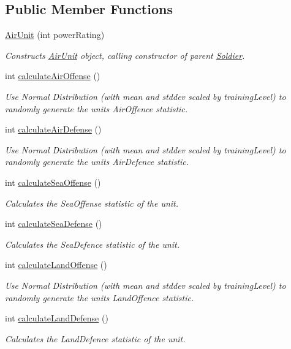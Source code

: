 \subsection*{Public Member Functions}
\begin{DoxyCompactItemize}
\item 
\mbox{\hyperlink{class_air_unit_aae4869e6b964d1ae03ab0c18cfc2631f}{Air\+Unit}} (int power\+Rating)
\begin{DoxyCompactList}\small\item\em Constructs \mbox{\hyperlink{class_air_unit}{Air\+Unit}} object, calling constructor of parent \mbox{\hyperlink{class_soldier}{Soldier}}. \end{DoxyCompactList}\item 
int \mbox{\hyperlink{class_air_unit_a522f54b197f6b2daf784f4a9eacb9edc}{calculate\+Air\+Offense}} ()
\begin{DoxyCompactList}\small\item\em Use Normal Distribution (with mean and stddev scaled by training\+Level) to randomly generate the unit\textquotesingle{}s Air\+Offence statistic. \end{DoxyCompactList}\item 
int \mbox{\hyperlink{class_air_unit_a78796cdf870a76c072e89445a4c8ba15}{calculate\+Air\+Defense}} ()
\begin{DoxyCompactList}\small\item\em Use Normal Distribution (with mean and stddev scaled by training\+Level) to randomly generate the unit\textquotesingle{}s Air\+Defence statistic. \end{DoxyCompactList}\item 
int \mbox{\hyperlink{class_air_unit_a1e0b1b7905336477733191c6a66cf022}{calculate\+Sea\+Offense}} ()
\begin{DoxyCompactList}\small\item\em Calculates the Sea\+Offense statistic of the unit. \end{DoxyCompactList}\item 
int \mbox{\hyperlink{class_air_unit_ab7cd17470efa06d53df2ad5be3964e7a}{calculate\+Sea\+Defense}} ()
\begin{DoxyCompactList}\small\item\em Calculates the Sea\+Defence statistic of the unit. \end{DoxyCompactList}\item 
int \mbox{\hyperlink{class_air_unit_ab5f13baf31eafe62bf482ec4501f4975}{calculate\+Land\+Offense}} ()
\begin{DoxyCompactList}\small\item\em Use Normal Distribution (with mean and stddev scaled by training\+Level) to randomly generate the unit\textquotesingle{}s Land\+Offence statistic. \end{DoxyCompactList}\item 
int \mbox{\hyperlink{class_air_unit_a5d408669d099d55d1bb19f71d6dc8712}{calculate\+Land\+Defense}} ()
\begin{DoxyCompactList}\small\item\em Calculates the Land\+Defence statistic of the unit. \end{DoxyCompactList}\end{DoxyCompactItemize}
